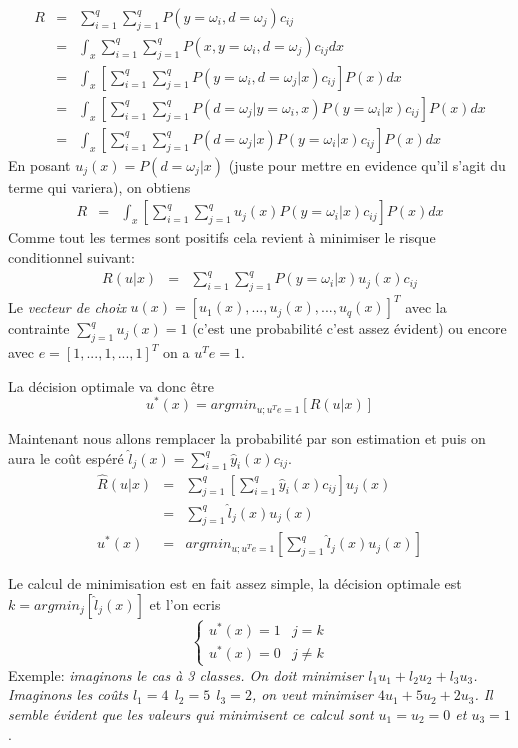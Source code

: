 \documentclass[a4paper, 11pt, onecolumn]{article}
\begin{document}
\begin{enumerate}
\begin{framed}
\begin{eqnarray}
R &=& \sum_{i=1}^q\sum_{j=1}^qP(y=\omega_i, d=\omega_j)c_{ij}\\
&=& \int_x \sum_{i=1}^q\sum_{j=1}^qP(x,y=\omega_i, d=\omega_j)c_{ij} dx\\
&=& \int_x \left[\sum_{i=1}^q\sum_{j=1}^qP(y=\omega_i, d=\omega_j|x)c_{ij}\right] P(x) dx\\
&=& \int_x \left[\sum_{i=1}^q\sum_{j=1}^qP(d=\omega_j|y=\omega_i,x)P(y=\omega_i|x)c_{ij}\right] P(x) dx\\
&=& \int_x \left[\sum_{i=1}^q\sum_{j=1}^qP(d=\omega_j|x)P(y=\omega_i|x)c_{ij}\right] P(x) dx
\end{eqnarray}
En posant $u_j(x) = P(d = \omega_j|x)$ (juste pour mettre en evidence qu'il s'agit du terme qui variera), on obtiens
\begin{eqnarray}
R &=& \int_x \left[\sum_{i=1}^q\sum_{j=1}^qu_j(x)P(y=\omega_i|x)c_{ij}\right] P(x) dx
\end{eqnarray}
Comme tout les termes sont positifs cela revient à minimiser le risque conditionnel suivant:
\begin{eqnarray}
R(u|x) &=& \sum_{i=1}^q\sum_{j=1}^qP(y=\omega_i|x)u_j(x)c_{ij}
\end{eqnarray}
Le \textit{vecteur de choix} $u(x) = [u_1(x), ..., u_j(x), ..., u_q(x)]^T$ avec la contrainte $\sum_{j=1}^q u_j(x) = 1$ (c'est une probabilité c'est assez évident) ou encore avec $e=[1, ..., 1, ...,1]^T$ on a $u^Te=1$.
\end{framed}

La décision optimale va donc être
$$u^*(x) = argmin_{u;u^Te=1}[R(u|x)]$$
\begin{framed}
Maintenant nous allons remplacer la probabilité par son estimation et puis on aura le coût espéré $\widehat{l}_j(x) = \sum_{i=1}^q \widehat{y}_i(x)c_{ij}$.
\begin{eqnarray}
\widehat{R}(u|x) &=& \sum_{j=1}^q[\sum_{i=1}^q\widehat{y}_i(x)c_{ij}]u_j(x) \\
&=& \sum_{j=1}^q\widehat{l}_j(x)u_j(x)\\
u^*(x) &=& argmin_{u;u^Te=1}\left[\sum_{j=1}^q\widehat{l}_j(x)u_j(x)\right]
\end{eqnarray}
\end{framed}

Le calcul de minimisation est en fait assez simple, la décision optimale est $k=argmin_j[\widehat{l}_j(x)]$ et l'on ecris 
$$
\left\{
\begin{array}{ll}
u^*(x) = 1 & j=k\\
u^*(x) = 0 & j\neq k
\end{array}
\right.
$$
Exemple: \textit{imaginons le cas à 3 classes. On doit minimiser $l_1u_1+l_2u_2+l_3u_3$. Imaginons les coûts $l_1=4\ \ l_2 = 5\ \ l_3=2$, on veut minimiser $4u_1+5u_2+2u_3$. Il semble évident que les valeurs qui minimisent ce calcul sont $u_1=u_2=0$ et $u_3 = 1$}.


\end{enumerate}
\end{document}
